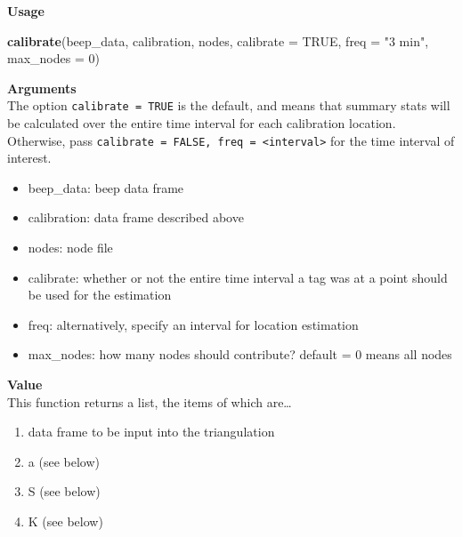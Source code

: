 \documentclass[
]{book}
\newenvironment{Shaded}{\begin{snugshade}}{\end{snugshade}}
\newcommand{\DataTypeTok}[1]{\textcolor[rgb]{0.13,0.29,0.53}{#1}}
\newcommand{\DecValTok}[1]{\textcolor[rgb]{0.00,0.00,0.81}{#1}}
\newcommand{\KeywordTok}[1]{\textcolor[rgb]{0.13,0.29,0.53}{\textbf{#1}}}
\newcommand{\NormalTok}[1]{#1}
\newcommand{\OtherTok}[1]{\textcolor[rgb]{0.56,0.35,0.01}{#1}}
\newcommand{\StringTok}[1]{\textcolor[rgb]{0.31,0.60,0.02}{#1}}
\providecommand{\tightlist}{%
  \setlength{\itemsep}{0pt}\setlength{\parskip}{0pt}}
\begin{document}
\textbf{Usage}

\begin{Shaded}
\begin{Highlighting}[]
\KeywordTok{calibrate}\NormalTok{(beep_data, calibration, nodes, }\DataTypeTok{calibrate =} \OtherTok{TRUE}\NormalTok{, }\DataTypeTok{freq =} \StringTok{"3 min"}\NormalTok{, }\DataTypeTok{max_nodes =} \DecValTok{0}\NormalTok{)}
\end{Highlighting}
\end{Shaded}

\textbf{Arguments}\\
The option \texttt{calibrate\ =\ TRUE} is the default, and means that summary stats will be calculated over the entire time interval for each calibration location. Otherwise, pass \texttt{calibrate\ =\ FALSE,\ freq\ =\ \textless{}interval\textgreater{}} for the time interval of interest.

\begin{itemize}
\tightlist
\item
  beep\_data: beep data frame\\
\item
  calibration: data frame described above\\
\item
  nodes: node file\\
\item
  calibrate: whether or not the entire time interval a tag was at a point should be used for the estimation
\item
  freq: alternatively, specify an interval for location estimation
\item
  max\_nodes: how many nodes should contribute? default = 0 means all nodes
\end{itemize}

\textbf{Value}\\
This function returns a list, the items of which are\ldots{}

\begin{enumerate}
\def\labelenumi{\arabic{enumi}.}
\tightlist
\item
  data frame to be input into the triangulation\\
\item
  a (see below)\\
\item
  S (see below)\\
\item
  K (see below)
\end{enumerate}
\end{document}
